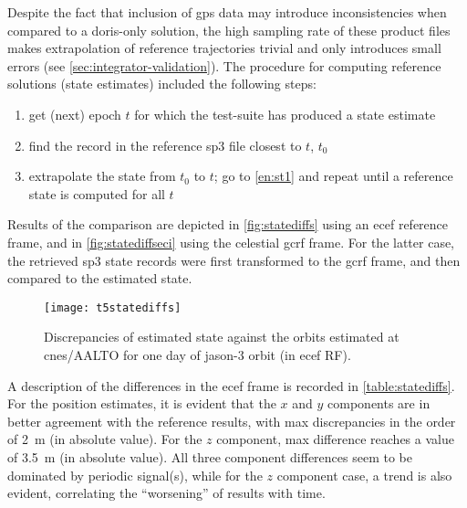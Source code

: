 Despite the fact that inclusion of \gls{gps} data may introduce inconsistencies 
when compared to a \gls{doris}-only solution, the high sampling rate of these 
product files makes extrapolation of reference trajectories trivial and only introduces 
small errors (see \autoref{sec:integrator-validation}). The procedure for computing 
reference solutions (state estimates) included the following steps:
\begin{enumerate}
  \item \label{en:st1} get (next) epoch $t$ for which the test-suite has produced a state estimate
  \item find the record in the reference sp3 file closest to $t$, $t_0$
  \item extrapolate the state from $t_0$ to $t$; go to \autoref{en:st1} and repeat 
    until a reference state is computed for all $t$
\end{enumerate}

Results of the comparison are depicted in \autoref{fig:statediffs} using an \gls{ecef} 
reference frame, and in \autoref{fig:statediffseci} using the celestial \gls{gcrf} 
frame. For the latter case, the retrieved sp3 state records were first transformed to 
the \gls{gcrf} frame, and then compared to the estimated state.

\begin{figure}
    \centering
    \texttt{[image: t5statediffs]}
    \caption{Discrepancies of estimated state against the orbits estimated at \gls{cnes}/AALTO for one day of \gls{jason}-3 orbit (in \gls{ecef} RF).}
    \label{fig:statediffs}
\end{figure}

A description of the differences in the \gls{ecef} frame is recorded in 
\autoref{table:statediffs}. For the position estimates, it is evident that the $x$ 
and $y$ components are in better 
agreement with the reference results, with max discrepancies in the order of 
\SI{2}{\metre} (in absolute value). For the $z$ component, max difference reaches 
a value of \SI{3.5}{\metre} (in absolute value). All three component differences 
seem to be dominated by periodic signal(s), while for the $z$ component case, 
a trend is also evident, correlating the ``worsening'' of results with time.

